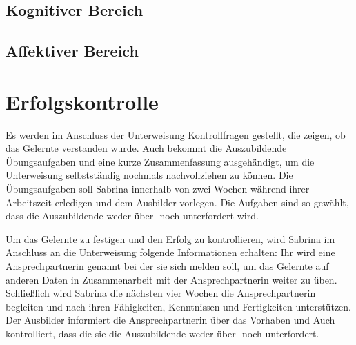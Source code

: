 \subsection{Kognitiver Bereich}

\subsection{Affektiver Bereich}


\section{Erfolgskontrolle}
Es werden im Anschluss der Unterweisung Kontrollfragen gestellt, die zeigen, ob das Gelernte verstanden wurde. Auch bekommt die Auszubildende Übungsaufgaben und eine kurze Zusammenfassung ausgehändigt, um die Unterweisung selbstständig nochmals nachvollziehen zu können. Die Übungsaufgaben soll Sabrina innerhalb von zwei Wochen während ihrer Arbeitszeit erledigen und dem Ausbilder vorlegen. Die Aufgaben sind so gewählt, dass die Auszubildende weder über- noch unterfordert wird.
\par
Um das Gelernte zu festigen und den Erfolg zu kontrollieren, wird Sabrina im Anschluss an die Unterweisung folgende Informationen erhalten: Ihr wird eine Ansprechpartnerin genannt bei der sie sich melden soll, um das Gelernte auf anderen Daten in Zusammenarbeit mit der Ansprechpartnerin weiter zu üben. Schließlich wird Sabrina die nächsten vier Wochen die Ansprechpartnerin begleiten und nach ihren Fähigkeiten, Kenntnissen und Fertigkeiten unterstützen. Der Ausbilder informiert die Ansprechpartnerin über das Vorhaben und Auch kontrolliert, dass die sie die Auszubildende weder über- noch unterfordert. 



